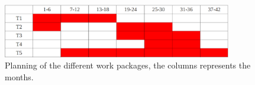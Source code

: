 \documentclass[12p]{article}
\begin{document}
\begin{figure}[h]


\centering
\includegraphics[width = 10cm]{planning.eps}
\caption{Planning of the different work packages, the columns represents the months.}
\label{fig:planning}
\end{figure}




\end{document}
